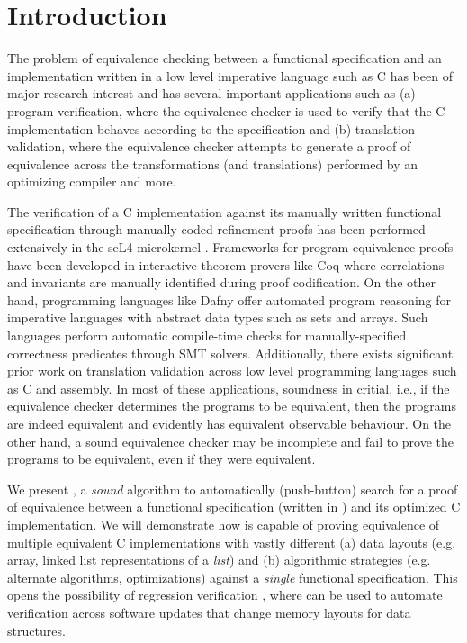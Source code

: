 \section{Introduction}
\label{sec:intro}
The problem of equivalence checking between a functional specification and an
implementation written in a low level imperative language such as C
has been of major research interest
and has several important applications such as (a) program verification, where
the equivalence checker is used to verify that the C implementation
behaves according to the specification and (b) translation validation, where
the equivalence checker attempts to generate a proof of equivalence across
the transformations (and translations) performed by an optimizing compiler
and more.

The verification of a C implementation against its manually written
functional specification through manually-coded refinement proofs has been
performed extensively in the seL4 microkernel \cite{seL4}.
Frameworks for program equivalence proofs have been developed in interactive
theorem provers like Coq \cite{programEquivalenceInCoq} where correlations and invariants
are manually identified during proof codification.
On the other hand, programming languages like Dafny \cite{dafny} offer automated program
reasoning for imperative languages with abstract data types such as sets and arrays.
Such languages perform automatic compile-time checks for manually-specified
correctness predicates through SMT solvers.
Additionally, there exists significant prior work on translation validation
\cite{tvi,tristan_tv_eqsat11,stepp_eqsat_llvm11,eqsat,pec,zuck03,zuck05,heffter05,covac,c_to_verilog,kanade09,lopes16,tvoc_cav05,ddec,semalign,oopsla20,tv_oskernel,namjoshi13}
across low level programming languages such as C and assembly.
In most of these applications, soundness in critial,
i.e., if the equivalence checker determines the programs to be equivalent, then the programs are indeed equivalent
and evidently has equivalent observable behaviour. On the other hand, a sound equivalence checker may be incomplete
and fail to prove the programs to be equivalent, even if they were equivalent.

We present \toolName{}, a {\em sound} algorithm to automatically (push-button) search
for a proof of equivalence between a functional specification (written in \SpecL{}) and its
optimized C implementation. We will demonstrate how \toolName{} is capable of
proving equivalence of multiple equivalent C implementations with vastly
different (a) data layouts (e.g. array, linked list representations of a {\em list})
and (b) algorithmic strategies (e.g. alternate algorithms, optimizations) against
a {\em single} functional specification.
This opens the possibility of regression verification \cite{strichman_regressverify,felsing14},
where \toolName{} can be used to automate verification across
software updates that change memory layouts for data structures.

